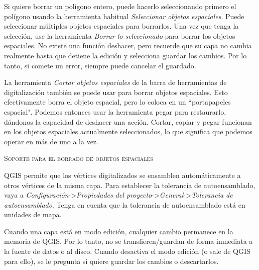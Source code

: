 
Si quiere borrar un polígono entero, puede hacerlo seleccionando primero el polígono usando la herramienta habitual \textsl{Seleccionar objetos espaciales}. Puede seleccionar múltiples objetos espaciales para borrarlos. Una vez que tenga la selección, use la herramienta \textsl{Borrar lo seleccionado} para borrar los objetos espaciales. No existe una función deshacer, pero recuerde que su capa no cambia realmente hasta que detiene la edición y selecciona guardar los cambios. Por lo tanto, si comete un error, siempre puede cancelar el guardado.

La herramienta \textsl{Cortar objetos espaciales} de la barra de herramientas de digitalización también se puede usar para borrar objetos espaciales. Esto efectivamente borra el objeto espacial, pero lo coloca en un ``portapapeles espacial". Podemos entonces usar la herramienta pegar para restaurarlo, dándonos la capacidad de deshacer una acción. Cortar, copiar y pegar funcionan en los objetos espaciales actualmente seleccionados, lo que significa que podemos operar en más de uno a la vez.

\begin{Tip}[h]\caption{\textsc{Soporte para el borrado de objetos espaciales}}
\end{Tip}

QGIS permite que los vértices digitalizados se ensamblen automáticamente a otros vértices de la misma capa. Para establecer la tolerancia de autoensamblado, vaya a \textit{Configuración}->\textit{Propiedades del proyecto}->\textit{General}->\textit{Tolerancia de autoensamblado}. Tenga en cuenta que la tolerancia de autoensamblado está en unidades de mapa.


Cuando una capa está en modo edición, cualquier cambio permanece en la memoria de QGIS. Por lo tanto, no se transfieren/guardan de forma inmediata a la fuente de datos o al disco. Cuando desactiva el modo edición (o sale de QGIS para ello), se le pregunta si quiere guardar los cambios o descartarlos.

